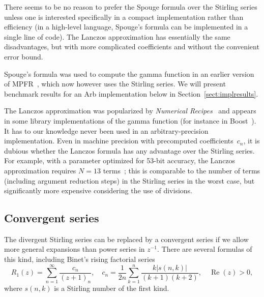 \documentclass[reqno]{amsart}
\newcommand{\Real}{\operatorname{Re}}
\theoremstyle{definition}
\begin{document}
There seems to be no reason to prefer
the Spouge formula over the Stirling series
unless one is interested specifically
in a compact implementation rather than efficiency (in a high-level language,
Spouge's formula can be implemented in a single line of code).
The Lanczos approximation has essentially the same disadvantages,
but with more complicated coefficients
and without the convenient error bound.

Spouge's formula was used to compute
the gamma function in an earlier version of MPFR~\cite{mpfralg},
which now however uses the Stirling series.
We will present benchmark results
for an Arb implementation below in Section~\ref{sect:implresults}.

The Lanczos approximation was popularized by \emph{Numerical Recipes}~\cite{press1989numerical}
and appears in some library implementations of the
gamma function (for instance in Boost~\cite{boost2021}).
It has to our knowledge never been used
in an arbitrary-precision implementation.
Even in machine precision with precomputed coefficients~$c_n$,
it is dubious whether the Lanczos formula has any advantage
over the Stirling series.
For example, with a parameter optimized for 53-bit accuracy, the Lanczos approximation
requires $N = 13$ terms~\cite{boost2021}; this is comparable to the number of terms (including
argument reduction steps) in the Stirling series in the worst case,
but significantly more expensive considering the use of divisions.

\subsection{Convergent series}

The divergent Stirling series can be replaced by a convergent series
if we allow more general expansions than power series in $z^{-1}$.
There are several formulas of this kind,
including Binet's rising factorial series \cite{binet1839memoire,vanmieghem2021binets} %
\begin{equation}
R_1(z) = \sum_{n=1}^{\infty} \frac{c_n}{(z+1)_{n}}, \quad c_n = \frac{1}{2n} \sum_{k=1}^n \frac{k|s(n, k)|}{(k + 1)(k + 2)}, \quad \Real(z) > 0,
\label{eq:binetseries}
\end{equation}
where $s(n,k)$ is a Stirling number of the first kind.
\end{document}
